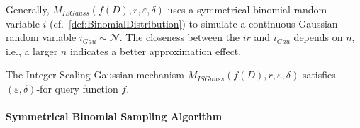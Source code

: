 Generally, $M_{ISGauss}\left(f\left(D\right),r,\varepsilon,\delta\right)$ uses a symmetrical binomial random variable $i $ (cf.~\autoref{def:BinomialDistribution}) to simulate a continuous Gaussian random variable $i_{Gau}\sim \mathcal{N}  $. The closeness between the $ir$ and $i_{Gau}$ depends on $n$, i.e., a larger $n$ indicates a better approximation effect.


\begin{theorem}
    The Integer-Scaling Gaussian mechanism $M_{ISGauss}\left(f\left(D\right),r,\varepsilon,\delta\right)$ satisfies $ \left(\varepsilon,\delta\right) $-\differentialprivacy for query function $f$.
\end{theorem}



\paragraph{Symmetrical Binomial Sampling Algorithm}
\label{para:SymmetricalBinomialSamplingAlgorithm}

